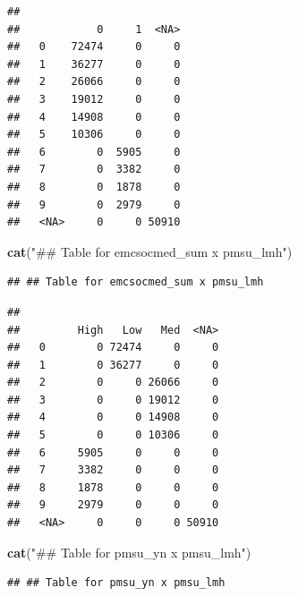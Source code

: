 \documentclass[
]{article}
\newenvironment{Shaded}{\begin{snugshade}}{\end{snugshade}}
\newcommand{\AttributeTok}[1]{\textcolor[rgb]{0.13,0.29,0.53}{#1}}
\newcommand{\FunctionTok}[1]{\textcolor[rgb]{0.13,0.29,0.53}{\textbf{#1}}}
\newcommand{\NormalTok}[1]{#1}
\newcommand{\SpecialCharTok}[1]{\textcolor[rgb]{0.81,0.36,0.00}{\textbf{#1}}}
\newcommand{\StringTok}[1]{\textcolor[rgb]{0.31,0.60,0.02}{#1}}
\begin{document}
\begin{verbatim}
##       
##            0     1  <NA>
##   0    72474     0     0
##   1    36277     0     0
##   2    26066     0     0
##   3    19012     0     0
##   4    14908     0     0
##   5    10306     0     0
##   6        0  5905     0
##   7        0  3382     0
##   8        0  1878     0
##   9        0  2979     0
##   <NA>     0     0 50910
\end{verbatim}

\begin{Shaded}
\begin{Highlighting}[]
\FunctionTok{cat}\NormalTok{(}\StringTok{"\#\# Table for emcsocmed\_sum x pmsu\_lmh"}\NormalTok{)}
\end{Highlighting}
\end{Shaded}

\begin{verbatim}
## ## Table for emcsocmed_sum x pmsu_lmh
\end{verbatim}

\begin{Shaded}
\end{Shaded}

\begin{verbatim}
##       
##         High   Low   Med  <NA>
##   0        0 72474     0     0
##   1        0 36277     0     0
##   2        0     0 26066     0
##   3        0     0 19012     0
##   4        0     0 14908     0
##   5        0     0 10306     0
##   6     5905     0     0     0
##   7     3382     0     0     0
##   8     1878     0     0     0
##   9     2979     0     0     0
##   <NA>     0     0     0 50910
\end{verbatim}

\begin{Shaded}
\begin{Highlighting}[]
\FunctionTok{cat}\NormalTok{(}\StringTok{"\#\# Table for pmsu\_yn x pmsu\_lmh"}\NormalTok{)}
\end{Highlighting}
\end{Shaded}

\begin{verbatim}
## ## Table for pmsu_yn x pmsu_lmh
\end{verbatim}
\end{document}
